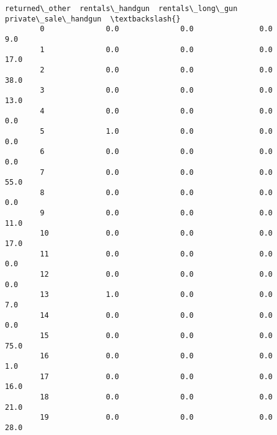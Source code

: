 \documentclass[11pt]{article}
\begin{document}
\begin{Verbatim}[commandchars=\\\{\}]
            returned\_other  rentals\_handgun  rentals\_long\_gun  private\_sale\_handgun  \textbackslash{}
        0              0.0              0.0               0.0                   9.0   
        1              0.0              0.0               0.0                  17.0   
        2              0.0              0.0               0.0                  38.0   
        3              0.0              0.0               0.0                  13.0   
        4              0.0              0.0               0.0                   0.0   
        5              1.0              0.0               0.0                   0.0   
        6              0.0              0.0               0.0                   0.0   
        7              0.0              0.0               0.0                  55.0   
        8              0.0              0.0               0.0                   0.0   
        9              0.0              0.0               0.0                  11.0   
        10             0.0              0.0               0.0                  17.0   
        11             0.0              0.0               0.0                   0.0   
        12             0.0              0.0               0.0                   0.0   
        13             1.0              0.0               0.0                   7.0   
        14             0.0              0.0               0.0                   0.0   
        15             0.0              0.0               0.0                  75.0   
        16             0.0              0.0               0.0                   1.0   
        17             0.0              0.0               0.0                  16.0   
        18             0.0              0.0               0.0                  21.0   
        19             0.0              0.0               0.0                  28.0   
        

\end{Verbatim}
\end{document}
